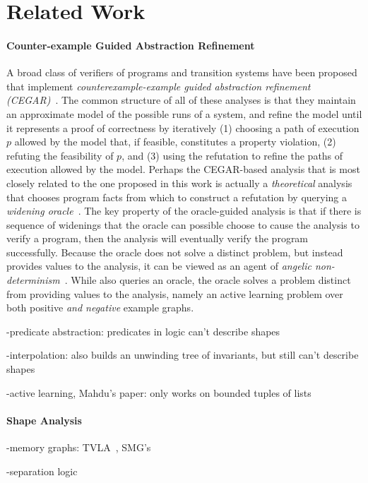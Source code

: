 \section{Related Work}
\label{sec:related-work}

\paragraph{Counter-example Guided Abstraction Refinement}
A broad class of verifiers of programs and transition systems have
been proposed that implement \emph{counterexample-example guided
  abstraction refinement (CEGAR)}~\cite{clarke03}.
%
The common structure of all of these analyses is that they maintain an
approximate model of the possible runs of a system, and refine the
model until it represents a proof of correctness by iteratively (1)
choosing a path of execution $p$ allowed by the model that, if
feasible, constitutes a property violation, (2) refuting the
feasibility of $p$, and (3) using the refutation to refine the paths
of execution allowed by the model.
Perhaps the CEGAR-based analysis that is most closely related to the
one proposed in this work is actually a \emph{theoretical} analysis
that chooses program facts from which to construct a refutation by
querying a \emph{widening oracle}~\cite{ball02}.
%
The key property of the oracle-guided analysis is that if there is
sequence of widenings that the oracle can possible choose to cause the
analysis to verify a program, then the analysis will eventually verify
the program successfully.
%
Because the oracle does not solve a distinct problem, but instead
provides values to the analysis, it can be viewed as an agent of
\emph{angelic non-determinism}~\cite{bodik10}.
While \verifier also queries an oracle, the oracle solves a problem
distinct from providing values to the analysis, namely an active
learning problem over both positive \emph{and negative} example
graphs.

-predicate abstraction: predicates in logic can't describe shapes
\cite{ball01,henzinger02,henzinger04}

-interpolation: also builds an unwinding tree of invariants, but still
can't describe
shapes\cite{albarghouthi12,heizmann10,mcmillan06,rummer13}

-active learning, Mahdu's paper: only works on bounded tuples of
lists~\cite{garg13}

\paragraph{Shape Analysis}

-memory graphs: TVLA~\cite{sagiv02}, SMG's\cite{dudka13}

-separation logic~\cite{calcagano11,reynolds02}


